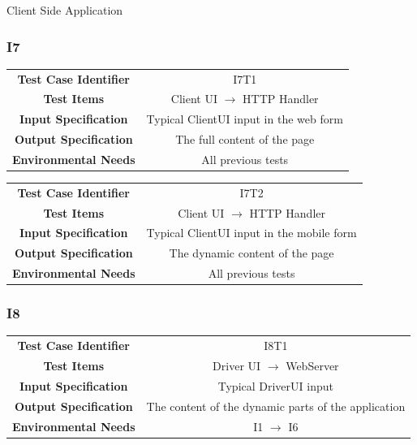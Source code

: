 \documentclass{article}
\begin{document}
Client Side Application
\subsubsection{I7}
\begin{adjustbox}{width=1.2\textwidth}	
	\begin{tabular}{*{2}{c}}
		\midrule
		\textbf{Test Case Identifier} & I7T1\\
		\textbf{Test Items} & Client UI $\rightarrow$ HTTP Handler\\
		\textbf{Input Specification} & Typical ClientUI input in the web form\\
		\textbf{Output Specification} & The full content of the page\\ 
		\textbf{Environmental Needs} & All previous tests\\
		\bottomrule
	\end{tabular}
\end{adjustbox}
\begin{adjustbox}{width=1.2\textwidth}	
	\begin{tabular}{*{2}{c}}
		\midrule
		\textbf{Test Case Identifier} & I7T2\\
		\textbf{Test Items} & Client UI $\rightarrow$ HTTP Handler\\
		\textbf{Input Specification} & Typical ClientUI input in the mobile form\\
		\textbf{Output Specification} & The dynamic content of the page\\ 
		\textbf{Environmental Needs} & All previous tests\\
		\bottomrule
	\end{tabular}
\end{adjustbox}


\subsubsection{I8}
\begin{adjustbox}{width=1.2\textwidth}	
	\begin{tabular}{*{2}{c}}
		\midrule
		\textbf{Test Case Identifier} & I8T1\\
		\textbf{Test Items} & Driver UI $\rightarrow$ WebServer\\
		\textbf{Input Specification} & Typical DriverUI input\\
		\textbf{Output Specification} & The content of the dynamic parts of the application\\
		\textbf{Environmental Needs} & I1 $\rightarrow$ I6\\
		\bottomrule
	\end{tabular}
\end{adjustbox}
\end{document}
